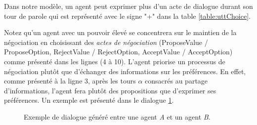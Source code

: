 \documentclass [french]{sig-alternate-05-2015}
\begin{document}
		Dans notre modèle, un agent peut exprimer plus d'un acte de dialogue durant son tour de parole qui est représenté avec le signe "+" dans la table \ref {table:uttChoice}.
		
		Notez qu'un agent avec un pouvoir élevé se concentrera sur le maintien de la négociation en choisissant  des \emph{actes de négociation} (ProposeValue / ProposeOption, RejectValue / RejectOption, AcceptValue / AcceptOption) comme présenté dans les lignes (4 à 10). L'agent priorise un processus de négociation plutôt que d'échanger des informations sur les préférences. En effet, comme présenté à la ligne 3, après les tours $ \alpha $ consacrés au partage d'informations, l'agent fera plutôt des propositions que d'exprimer ses préférences. Un exemple est présenté dans le dialogue \ref {fig:ex-dialogue}.
		
		\begin{figure}
			
			\caption{\label{fig:ex-dialogue}Exemple de dialogue généré entre une agent \textit{A} et un agent \textit{B}.}
		\end{figure}
		
\end{document}
